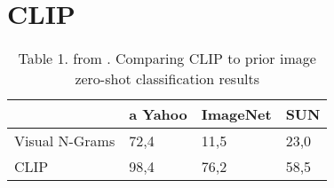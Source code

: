 \chapter{CLIP}

\begin{table}[]
    \begin{tabular}{llll}
        \hline
     &  a Yahoo& ImageNet& SUN \\\hline
     Visual N-Grams&  72,4&  11,5&  23,0\\
     CLIP&  98,4&  76,2&58,5\\ \hline
    \end{tabular}
    \caption{Table 1. from \cite{clip}. Comparing CLIP to prior image zero-shot classification results\cite{Vis_N_Grams}}
\end{table}